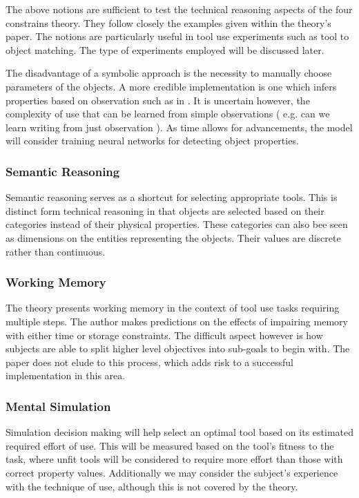 \documentclass[11]{article}
\begin{document}
The above notions are sufficient to test the technical reasoning aspects of the four constrains theory. They follow closely the examples given within the theory's paper. The notions are particularly useful in tool use experiments such as tool to object matching. The type of experiments employed will be discussed later.  

The disadvantage of a symbolic approach is the necessity to manually choose parameters of the objects. A more credible implementation is one which infers properties based on observation such as in \cite{zhu2015}. It is uncertain however, the complexity of use that can be learned from simple observations ( e.g. can we learn writing from just observation ).  As time allows for advancements, the model will consider training neural networks for detecting object properties.

\subsubsection*{Semantic Reasoning}

Semantic reasoning serves as a shortcut for selecting appropriate tools. This is distinct form technical reasoning in that objects are selected based on their categories instead of their physical properties. These categories can also bee seen as dimensions on the entities representing the objects. Their values are discrete rather than continuous. 

\subsubsection*{Working Memory}

The theory presents working memory in the context of tool use tasks requiring multiple steps. The author makes predictions on the effects of impairing memory with either time or storage constraints\cite{osiurak2014}. The difficult aspect however is how subjects are able to split higher level objectives into sub-goals to begin with. The paper does not elude to this process, which adds risk to a successful implementation in this area. 

\subsubsection*{Mental Simulation}

Simulation decision making will help select an optimal tool based on its estimated required effort of use. This will be measured based on the tool's fitness to the task, where unfit tools will be considered to require more effort than those with correct property values. Additionally we may consider the subject's experience with the technique of use, although this is not covered by the theory.
\end{document}
